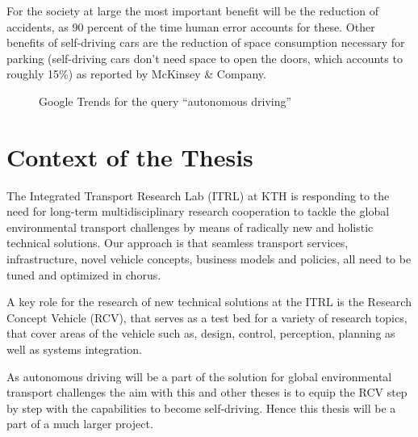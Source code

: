For the society at large the most important benefit will be the reduction of accidents, as 90 percent of the time human error accounts for these. Other benefits of self-driving cars are the reduction of space consumption necessary for parking (self-driving cars don't need space to open the doors, which accounts to roughly 15\%) as reported by McKinsey \& Company. \cite{Bertoncello.2015}

\begin{figure}[h]
\caption{Google Trends for the query ``autonomous driving''}
\label{fig:googleTrends}
\end{figure}

\section{Context of the Thesis}
The Integrated Transport Research Lab (ITRL) at KTH is responding to the need for long-term multidisciplinary research cooperation to tackle the global environmental transport challenges by means of radically new and holistic technical solutions. Our approach is that seamless transport services, infrastructure, novel vehicle concepts, business models and policies, all need to be tuned and optimized in chorus.

A key role for the research of new technical solutions at the ITRL is the Research Concept Vehicle (RCV), that serves as a test bed for a variety of research topics, that cover areas of the vehicle such as, design, control, perception, planning as well as systems integration.

As autonomous driving will be a part of the solution for global environmental transport challenges the aim with this and other theses is to equip the RCV step by step with the capabilities to become self-driving. Hence this thesis will be a part of a much larger project.

